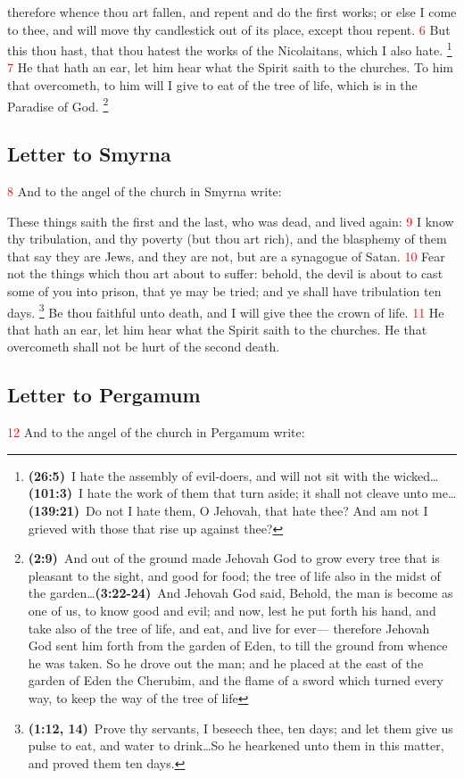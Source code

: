 \documentclass[12pt,twoside]{memoir}
\newcommand{\cbibleref}[3]{\textbf{\ibibleverse[textit]{#1}(#2)}\ {#3}}
\newcommand{\cbiblechvs}[3]{\textbf{\ibiblechvs[textit]{#1}(#2)}\ {#3}}
\newcommand{\cbiblefoot}[3]{\footnote{\cbibleref{#1}{#2}{#3}}}
\newcommand{\cbiblefootduosb}[5]{\footnote{\cbibleref{#1}{#2}{#3}\ldots \cbiblechvs{#1}{#4}{#5}}} %
\newcommand{\cbiblefoottriosb}[7]{\footnote{\cbibleref{#1}{#2}{#3}\ldots \cbiblechvs{#1}{#4}{#5}\ldots \cbiblechvs{#1}{#6}{#7}}}
\newcommand{\vnum}[1]{\textcolor{red}{\normalsize{#1}}}
\begin{document}
therefore whence thou art fallen, and repent and do the first works; or else I come to thee, and will move thy candlestick out of its place, except thou repent. %
\vnum{6} But this thou hast, that thou hatest the works of the Nicolaitans, which I also hate.%
	\cbiblefoottriosb{Psalms}{26:5}{I hate the assembly of evil-doers, and will not sit with the wicked}%
			{101:3}{I hate the work of them that turn aside; it shall not cleave unto me}%
			{139:21}{Do not I hate them, O Jehovah, that hate thee? And am not I grieved with those that rise up against thee?} %
\vnum{7} He that hath an ear, let him hear what the Spirit saith to the churches. To him that overcometh, to him will I give to eat of the tree of life, which is in the Paradise of God.%
	\cbiblefootduosb{Genesis}{2:9}{And out of the ground made Jehovah God to grow every tree that is pleasant to the sight, and good for food; the tree of life also in the midst of the garden}%
				{3:22-24}{And Jehovah God said, Behold, the man is become as one of us, to know good and evil; and now, lest he put forth his hand, and take also of the tree of life, and eat, and live for ever— therefore Jehovah God sent him forth from the garden of Eden, to till the ground from whence he was taken. So he drove out the man; and he placed at the east of the garden of Eden the Cherubim, and the flame of a sword which turned every way, to keep the way of the tree of life}
\subsection*{Letter to Smyrna}
\vnum{8} And to the angel of the church in Smyrna write:

These things saith the first and the last, who was dead, and lived again: %
\vnum{9} I know thy tribulation, and thy poverty (but thou art rich), and the blasphemy of them that say they are Jews, and they are not, but are a synagogue of Satan. %
\vnum{10} Fear not the things which thou art about to suffer: behold, the devil is about to cast some of you into prison, that ye may be tried; and ye shall have tribulation ten days.%
	\cbiblefoot{Daniel}{1:12, 14}{Prove thy servants, I beseech thee, ten days; and let them give us pulse to eat, and water to drink\ldots So he hearkened unto them in this matter, and proved them ten days.}%
 Be thou faithful unto death, and I will give thee the crown of life. %
\vnum{11} He that hath an ear, let him hear what the Spirit saith to the churches. He that overcometh shall not be hurt of the second death.
\subsection*{Letter to Pergamum}
\vnum{12} And to the angel of the church in Pergamum write:
\end{document}
